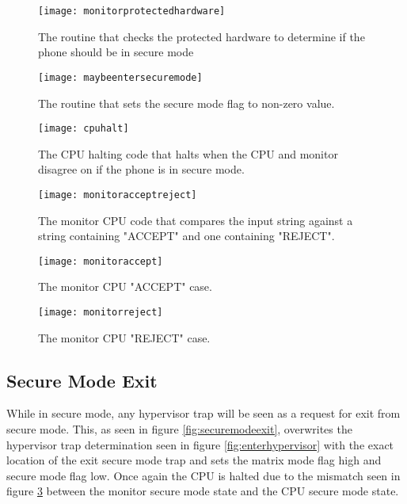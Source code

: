 \begin{figure}
  \centering
  \texttt{[image: monitorprotectedhardware]}
  \caption{The routine that checks the protected hardware to determine if the phone should be in secure mode}
  \label{fig:monitorprotectedhardware}
\end{figure}

\begin{figure}
  \centering
  \texttt{[image: maybeentersecuremode]}
  \caption{The routine that sets the secure mode flag to non-zero value.}
  \label{fig:maybeentersecuremode}
\end{figure}

\begin{figure}
  \centering
  \texttt{[image: cpuhalt]}
  \caption{The CPU halting code that halts when the CPU and monitor disagree on if the phone is in secure mode.}
  \label{fig:cpuhalt}
\end{figure}

\begin{figure}
  \centering
  \texttt{[image: monitoracceptreject]}
  \caption{The monitor CPU code that compares the input string against a string containing "ACCEPT" and one containing "REJECT".}
  \label{fig:monitoracceptreject}
\end{figure}

\begin{figure}
  \centering
  \texttt{[image: monitoraccept]}
  \caption{The monitor CPU "ACCEPT" case.}
  \label{fig:monitoraccept}
\end{figure}

\begin{figure}
  \centering
  \texttt{[image: monitorreject]}
  \caption{The monitor CPU "REJECT" case.}
  \label{fig:monitorreject}
\end{figure}


\subsection{Secure Mode Exit}

\label{Ch6 Sec3 Sub4}

While in secure mode, any hypervisor trap will be seen as a request for exit from secure mode. This, as seen in figure \ref{fig:securemodeexit}, overwrites the hypervisor trap determination seen in figure \ref{fig:enterhypervisor} with the exact location of the exit secure mode trap and sets the matrix mode flag high and secure mode flag low. Once again the CPU is halted due to the mismatch seen in figure \ref{fig:cpuhalt} between the monitor secure mode state and the CPU secure mode state.\\

